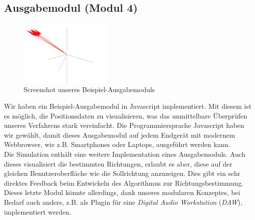 \subsection{Ausgabemodul (Modul 4)}
\begin{figure}
	\centering
    \includegraphics[width=0.4\textwidth]{img/output}
    \caption{Screenshot unseres Beispiel-Ausgabemoduls\label{fig:output}}
\end{figure}
Wir haben ein Beispiel-Ausgabemodul in Javascript implementiert. Mit diesem ist es möglich, die Positionsdaten zu visualisieren, was das unmittelbare Überprüfen unseres Verfahrens stark vereinfacht. Die Programmiersprache Javascript haben wir gewählt, damit dieses Ausgabemodul auf jedem Endgerät mit modernem Webbrowser, wie z.B. Smartphones oder Laptops, ausgeführt werden kann.\\
Die Simulation enthält eine weitere Implementation eines Ausgabemoduls. Auch dieses visualisiert die bestimmten Richtungen, erlaubt es aber, diese auf der gleichen Benutzeroberfläche wie die Sollrichtung anzuzeigen. Dies gibt ein sehr direktes Feedback beim Entwickeln des Algorithmus zur Richtungsbestimmung. Dieses letzte Modul könnte allerdings, dank unseres modularen Konzeptes, bei Bedarf auch anders, z.B. als Plugin für eine \textit{Digital Audio Workstation} (\textit{DAW}), implementiert werden.


